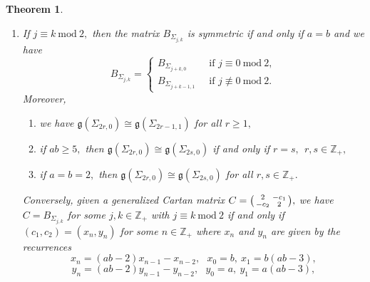 \documentclass[12pt,reqno]{amsart}
\theoremstyle{plain}
\newtheorem*{thm}{Theorem}
\theoremstyle{definition}
\theoremstyle{remark}
\newcommand{\lie}[1]{\mathfrak{#1}}
\newcommand\bz{\mathbb Z}
\begin{document}
\begin{thm}
\begin{enumerate}
        \item If $j\equiv k\ \mathrm{mod}\ 2,$ then the matrix $B_{\Sigma_{j,k}}$ is symmetric if and only if $a=b$ and we have $$B_{\Sigma_{j,k}}= \begin{cases}
            B_{\Sigma_{j+k,0}}\ &\text{ if } j\equiv 0\ \mathrm{mod}\ 2,\\
            B_{\Sigma_{j+k-1,1}}\ &\text{ if }j\not\equiv 0\ \mathrm{mod}\ 2.
        \end{cases}$$
        Moreover, 
        \begin{enumerate}
            \item we have $\lie g(\Sigma_{2r,0})\cong \lie g(\Sigma_{2r-1,1})$ for all $r\geq 1,$\vspace{0,2cm}
            \item if $ab\geq 5,$ then $\lie g(\Sigma_{2r,0})\cong \lie g(\Sigma_{2s,0})$ if and only if $r=s,\ \ r,s\in\bz_+,$\vspace{0,2cm}
            \item if $a=b=2,$ then $\lie g(\Sigma_{2r,0})\cong \lie g(\Sigma_{2s,0})$ for all $r,s\in \bz_+.$
        \end{enumerate}
        \medskip
        
        \noindent Conversely, given a generalized Cartan matrix $C=\begin{psmallmatrix}
            2& -c_1\\ -c_2& 2
        \end{psmallmatrix},$ we have $C=B_{\Sigma_{j,k}}$ for some 
        $j,k\in\bz_+$ with $j\equiv k\ \mathrm{mod}\ 2$ if and only if $(c_1,c_2)=(x_n,y_n)$ for some $n\in\bz_+$ where $x_n$ and $y_n$ are given by the recurrences  
        $$x_n=(ab-2)x_{n-1}-x_{n-2},\ \ \ x_0=b,\ x_1=b(ab-3),$$
        $$y_n=(ab-2)y_{n-1}-y_{n-2},\ \ \ y_0=a,\ y_1=a(ab-3),$$
    \end{enumerate}
\end{thm}
\end{document}
